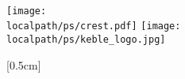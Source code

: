 \begin{titlepage}
\begin{center}



{\Large \bf
\xtitle}\\


\vspace{3cm}

%

{\Large 
\xauthor\\
\xcollege\\
}
\vspace*{1cm}
\begin{center}
\texttt{[image: \\localpath/ps/crest.pdf]}
\hspace*{2cm}
\texttt{[image: \\localpath/ps/keble\_logo.jpg]}
\end{center}

%
%
\vspace*{1cm}
\normalsize

[0.5cm]
{\bf \xterm}\\

\vspace{2cm}

\end{center}
\end{titlepage}

